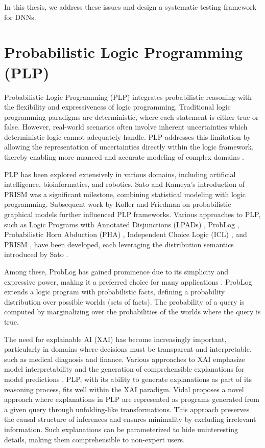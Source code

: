 In this thesis, we address these issues and design a systematic testing framework for DNNs.





\section{Probabilistic Logic Programming (PLP)}

Probabilistic Logic Programming (PLP) integrates probabilistic reasoning with the flexibility and expressiveness of logic programming. Traditional logic programming paradigms are deterministic, where each statement is either true or false. However, real-world scenarios often involve inherent uncertainties which deterministic logic cannot adequately handle. PLP addresses this limitation by allowing the representation of uncertainties directly within the logic framework, thereby enabling more nuanced and accurate modeling of complex domains \cite{Sato2001, Kimmig2011}.

PLP has been explored extensively in various domains, including artificial intelligence, bioinformatics, and robotics. Sato and Kameya's introduction of PRISM \cite{Sato1997} was a significant milestone, combining statistical modeling with logic programming. Subsequent work by Koller and Friedman \cite{Koller2009} on probabilistic graphical models further influenced PLP frameworks. Various approaches to PLP, such as Logic Programs with Annotated Disjunctions (LPADs) \cite{Vennekens2004}, ProbLog \cite{DeRaedt2007}, Probabilistic Horn Abduction (PHA) \cite{Poole1993}, Independent Choice Logic (ICL) \cite{Poole1997}, and PRISM \cite{Sato2001}, have been developed, each leveraging the distribution semantics introduced by Sato \cite{Sato2001}.

Among these, ProbLog has gained prominence due to its simplicity and expressive power, making it a preferred choice for many applications \cite{Kimmig2011}. ProbLog extends a logic program with probabilistic facts, defining a probability distribution over possible worlds (sets of facts). The probability of a query is computed by marginalizing over the probabilities of the worlds where the query is true.

The need for explainable AI (XAI) has become increasingly important, particularly in domains where decisions must be transparent and interpretable, such as medical diagnosis and finance. Various approaches to XAI emphasize model interpretability and the generation of comprehensible explanations for model predictions \cite{Arrieta2020}. PLP, with its ability to generate explanations as part of its reasoning process, fits well within the XAI paradigm. Vidal \cite{Vidal2023} proposes a novel approach where explanations in PLP are represented as programs generated from a given query through unfolding-like transformations. This approach preserves the causal structure of inferences and ensures minimality by excluding irrelevant information. Such explanations can be parameterized to hide uninteresting details, making them comprehensible to non-expert users.


